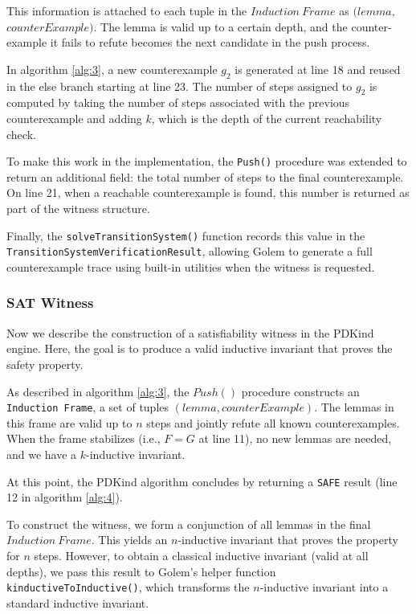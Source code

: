 This information is attached to each tuple in the \( Induction\ Frame \) as \(
(lemma, \) \\ \( counterExample) \). The lemma is valid up to a certain depth, and the
counter-\\example it fails to refute becomes the next candidate in the push
process.

In algorithm \ref{alg:3}, a new counterexample $g_2$
is generated at line 18 and reused in the else branch starting at line 23. The
number of steps assigned to $g_2$ is computed by taking the number of steps
associated with the previous counterexample and adding \( k \), which is the
depth of the current reachability check.

To make this work in the implementation, the \texttt{Push()} procedure was
extended to return an additional field: the total number of steps to the final
counterexample. On line 21, when a reachable counterexample is found, this
number is returned as part of the witness structure.

Finally, the \texttt{solveTransitionSystem()} function records this value in
the \texttt{TransitionSystemVerificationResult}, allowing Golem to generate a
full counterexample trace using built-in utilities when the witness is
requested.

\subsubsection*{SAT Witness}

\noindent Now we describe the construction of a satisfiability witness in the
PDKind engine. Here, the goal is to produce a valid inductive invariant that
proves the safety property.

As described in algorithm \ref{alg:3}, the \( Push()
\) procedure constructs an \texttt{Induction\ Frame}, a set of tuples \( (lemma,
counterExample) \). The lemmas in this frame are valid up to \( n \) steps and
jointly refute all known counterexamples. When the frame stabilizes (i.e., \( F
= G \) at line 11), no new lemmas are needed, and we have a \( k \)-inductive
invariant.

At this point, the PDKind algorithm concludes by returning a \texttt{SAFE}
result (line 12 in algorithm \ref{alg:4}).

To construct the witness, we form a conjunction of all lemmas in the final \(
Induction\ Frame \). This yields an \( n \)-inductive invariant that proves the
property for \( n \) steps. However, to obtain a classical inductive invariant
(valid at all depths), we pass this result to Golem's helper function
\texttt{kinductiveToInductive()}, which transforms the \( n \)-inductive
invariant into a standard inductive invariant.

